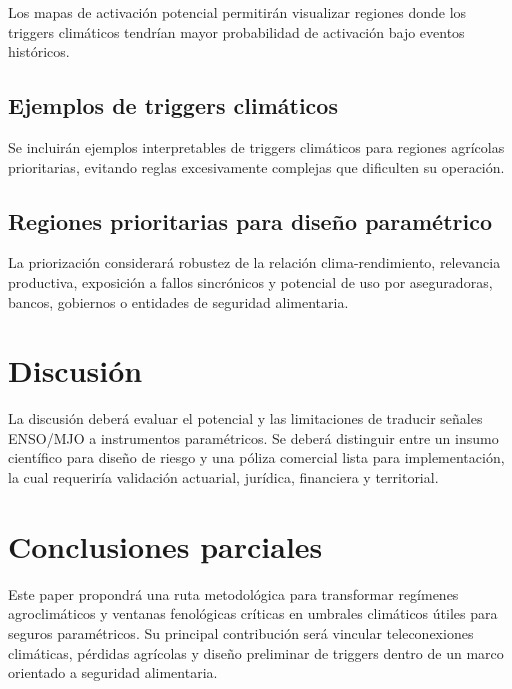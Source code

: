 Los mapas de activación potencial permitirán visualizar regiones donde los triggers climáticos tendrían mayor probabilidad de activación bajo eventos históricos.


\subsection{Ejemplos de triggers climáticos}

Se incluirán ejemplos interpretables de triggers climáticos para regiones agrícolas prioritarias, evitando reglas excesivamente complejas que dificulten su operación.


\subsection{Regiones prioritarias para diseño paramétrico}

La priorización considerará robustez de la relación clima-rendimiento, relevancia productiva, exposición a fallos sincrónicos y potencial de uso por aseguradoras, bancos, gobiernos o entidades de seguridad alimentaria.


\section{Discusión}

La discusión deberá evaluar el potencial y las limitaciones de traducir señales ENSO/MJO a instrumentos paramétricos. Se deberá distinguir entre un insumo científico para diseño de riesgo y una póliza comercial lista para implementación, la cual requeriría validación actuarial, jurídica, financiera y territorial.


\section{Conclusiones parciales}

Este paper propondrá una ruta metodológica para transformar regímenes agroclimáticos y ventanas fenológicas críticas en umbrales climáticos útiles para seguros paramétricos. Su principal contribución será vincular teleconexiones climáticas, pérdidas agrícolas y diseño preliminar de triggers dentro de un marco orientado a seguridad alimentaria.

